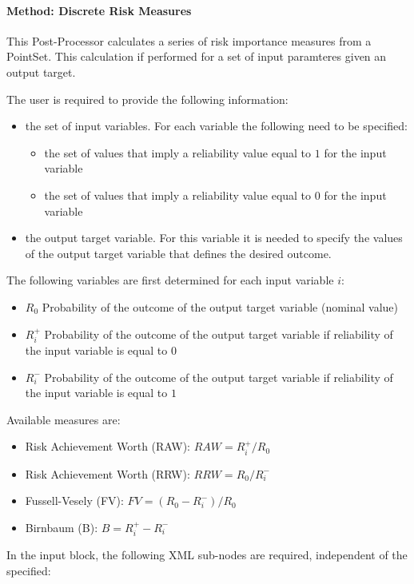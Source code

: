 \paragraph{Method: Discrete Risk Measures}
This Post-Processor calculates a series of risk importance measures from a PointSet. This calculation if performed for a set of input paramteres given an output target.

The user is required to provide the following information:
\begin{itemize}
   \item the set of input variables. For each variable the following need to be specified:
     \begin{itemize}
       \item the set of values that imply a reliability value equal to $1$ for the input variable
       \item the set of values that imply a reliability value equal to $0$ for the input variable
     \end{itemize}
   \item the output target variable. For this variable it is needed to specify the values of the output target variable that defines the desired outcome.
\end{itemize}

The following variables are first determined for each input variable $i$:
\begin{itemize}
   \item $R_0$ Probability of the outcome of the output target variable (nominal value)
   \item $R^{+}_i$ Probability of the outcome of the output target variable if reliability of the input variable is equal to $0$
   \item $R^{-}_i$ Probability of the outcome of the output target variable if reliability of the input variable is equal to $1$
\end{itemize}

Available measures are:
\begin{itemize}
   \item Risk Achievement Worth (RAW): $RAW = R^{+}_i / R_0 $
   \item Risk Achievement Worth (RRW): $RRW = R_0 / R^{-}_i$
   \item Fussell-Vesely (FV): $FV = (R_0 - R^{-}_i) / R_0$
   \item Birnbaum (B): $B = R^{+}_i - R^{-}_i$
\end{itemize}

In the  input block, the following XML sub-nodes are required,
independent of the  specified:

